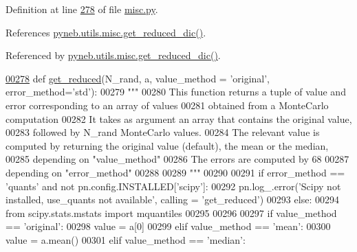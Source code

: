 Definition at line \hyperlink{misc_8py_source_l00278}{278} of file \hyperlink{misc_8py_source}{misc.\+py}.



References \hyperlink{misc_8py_source_l00328}{pyneb.\+utils.\+misc.\+get\+\_\+reduced\+\_\+dic()}.



Referenced by \hyperlink{misc_8py_source_l00328}{pyneb.\+utils.\+misc.\+get\+\_\+reduced\+\_\+dic()}.


\begin{DoxyCode}
\hypertarget{namespacepyneb_1_1utils_1_1misc_l00278}{}\hyperlink{namespacepyneb_1_1utils_1_1misc_ae69de9c9e8f8bde114b8edd326f3b993}{00278} \textcolor{keyword}{def }\hyperlink{namespacepyneb_1_1utils_1_1misc_ae69de9c9e8f8bde114b8edd326f3b993}{get\_reduced}(N\_rand, a, value\_method = 'original', error\_method='std'):
00279     \textcolor{stringliteral}{"""}
00280 \textcolor{stringliteral}{    This function returns a tuple of value and error corresponding to an array of values }
00281 \textcolor{stringliteral}{        obtained from a MonteCarlo computation}
00282 \textcolor{stringliteral}{    It takes as argument an array that contains the original value, }
00283 \textcolor{stringliteral}{        followed by N\_rand MonteCarlo values.}
00284 \textcolor{stringliteral}{    The relevant value is computed by returning the original value (default), the mean or the median, }
00285 \textcolor{stringliteral}{        depending on "value\_method"}
00286 \textcolor{stringliteral}{    The errors are computed by 68%
00287 \textcolor{stringliteral}{        depending on "error\_method"}
00288 \textcolor{stringliteral}{    }
00289 \textcolor{stringliteral}{    """}
00290 
00291     \textcolor{keywordflow}{if} error\_method == \textcolor{stringliteral}{'quants'} \textcolor{keywordflow}{and} \textcolor{keywordflow}{not} pn.config.INSTALLED[\textcolor{stringliteral}{'scipy'}]:
00292         pn.log\_.error(\textcolor{stringliteral}{'Scipy not installed, use\_quants not available'}, calling = \textcolor{stringliteral}{'get\_reduced'})
00293     \textcolor{keywordflow}{else}:
00294         \textcolor{keyword}{from} scipy.stats.mstats \textcolor{keyword}{import} mquantiles
00295     
00296     
00297     \textcolor{keywordflow}{if} value\_method == \textcolor{stringliteral}{'original'}:
00298         value = a[0]
00299     \textcolor{keywordflow}{elif} value\_method == \textcolor{stringliteral}{'mean'}:
00300         value = a.mean()
00301     \textcolor{keywordflow}{elif} value\_method == \textcolor{stringliteral}{'median'}:
}
\end{DoxyCode}

